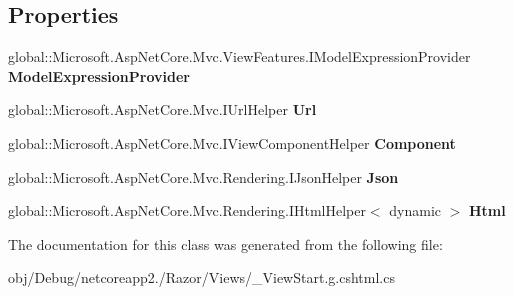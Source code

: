 \subsection*{Properties}
\begin{DoxyCompactItemize}
\item 
\mbox{\label{class_asp_net_core_1_1_views_____view_start_a97902ea5e8251ff63e9a2f4dd5389943}} 
global\+::\+Microsoft.\+Asp\+Net\+Core.\+Mvc.\+View\+Features.\+I\+Model\+Expression\+Provider {\bfseries Model\+Expression\+Provider}
\item 
\mbox{\label{class_asp_net_core_1_1_views_____view_start_aac82cabef8b298088c0b7a539476bd8b}} 
global\+::\+Microsoft.\+Asp\+Net\+Core.\+Mvc.\+I\+Url\+Helper {\bfseries Url}
\item 
\mbox{\label{class_asp_net_core_1_1_views_____view_start_a8da75bb43bca5132bd26959b13ddc80b}} 
global\+::\+Microsoft.\+Asp\+Net\+Core.\+Mvc.\+I\+View\+Component\+Helper {\bfseries Component}
\item 
\mbox{\label{class_asp_net_core_1_1_views_____view_start_adfc91850c1c9d9409b39c4924ba516d4}} 
global\+::\+Microsoft.\+Asp\+Net\+Core.\+Mvc.\+Rendering.\+I\+Json\+Helper {\bfseries Json}
\item 
\mbox{\label{class_asp_net_core_1_1_views_____view_start_a9028a34d35592e52ebf62a6600d04aba}} 
global\+::\+Microsoft.\+Asp\+Net\+Core.\+Mvc.\+Rendering.\+I\+Html\+Helper$<$ dynamic $>$ {\bfseries Html}
\end{DoxyCompactItemize}


The documentation for this class was generated from the following file\+:\begin{DoxyCompactItemize}
\item 
obj/\+Debug/netcoreapp2./\+Razor/\+Views/\+\_\+\+View\+Start.\+g.\+cshtml.\+cs\end{DoxyCompactItemize}
